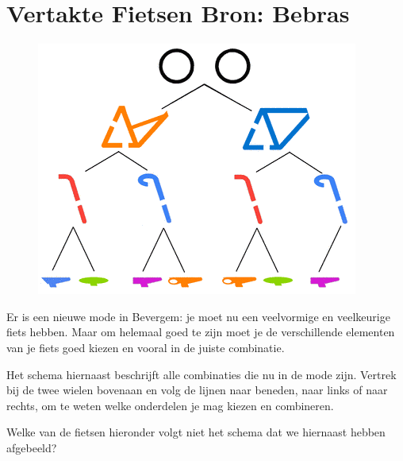 \documentclass[12pt]{article}
\begin{document}
	\begin{minipage}{\textwidth}
		\section{Vertakte Fietsen \hfill\small Bron: Bebras}
			\begin{figure} 
				\includegraphics[width=\linewidth]{image1}
			\end{figure}
			Er is een nieuwe mode in Bevergem: je moet nu een veelvormige en veelkeurige fiets hebben. Maar om helemaal goed te zijn moet je de verschillende elementen van je fiets goed kiezen en vooral in de juiste combinatie.
			
			Het schema hiernaast beschrijft alle combinaties die nu in de mode zijn. Vertrek bij de twee wielen bovenaan en volg de lijnen naar beneden, naar links of naar rechts, om te weten welke onderdelen je mag kiezen en combineren.
			
			Welke van de fietsen hieronder volgt niet het schema dat we hiernaast hebben afgebeeld?
			\vspace{1cm}
			

\end{minipage}
\end{document}
